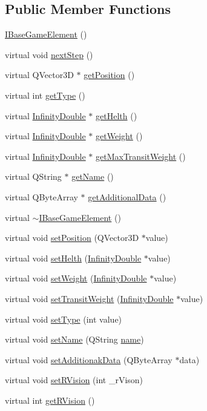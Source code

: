 \subsection*{Public Member Functions}
\begin{DoxyCompactItemize}
\item 
\hyperlink{a00137_ae72e1c7b4ecb3cf88e2a86ff4a331e88}{I\+Base\+Game\+Element} ()
\item 
virtual void \hyperlink{a00137_ae2be75da1a2a9edfabe993770e24654a}{next\+Step} ()
\item 
virtual Q\+Vector3D $\ast$ \hyperlink{a00137_a3159c02c1118989e3476b52d89a52401}{get\+Position} ()
\item 
virtual int \hyperlink{a00137_a639bd1e233821ff606bb8fe2931f6ee7}{get\+Type} ()
\item 
virtual \hyperlink{a00161}{Infinity\+Double} $\ast$ \hyperlink{a00137_a13a00e39ece3e20e3f5e049224da8d40}{get\+Helth} ()
\item 
virtual \hyperlink{a00161}{Infinity\+Double} $\ast$ \hyperlink{a00137_a935a07134430bbb44c3214629d607a3d}{get\+Weight} ()
\item 
virtual \hyperlink{a00161}{Infinity\+Double} $\ast$ \hyperlink{a00137_a4c74c903e19ada9da9150cf9569b4e9d}{get\+Max\+Transit\+Weight} ()
\item 
virtual Q\+String $\ast$ \hyperlink{a00137_a01051b9a502128a82f9a168a14d1ecdc}{get\+Name} ()
\item 
virtual Q\+Byte\+Array $\ast$ \hyperlink{a00137_aaf3cdf5f4e893704c9f17c524a1f0a8c}{get\+Additional\+Data} ()
\item 
virtual \hyperlink{a00137_a01bfcab29a22628978a22b0f7db58623}{$\sim$\+I\+Base\+Game\+Element} ()
\item 
virtual void \hyperlink{a00137_a54dc1a743fac99db03c3f47b5c6d69c4}{set\+Position} (Q\+Vector3D $\ast$value)
\item 
virtual void \hyperlink{a00137_a2f95e7a61b5db7f2fbbfd32ff786f58c}{set\+Helth} (\hyperlink{a00161}{Infinity\+Double} $\ast$value)
\item 
virtual void \hyperlink{a00137_a4b5e42aa7985c9bf959f0275cbc1bac7}{set\+Weight} (\hyperlink{a00161}{Infinity\+Double} $\ast$value)
\item 
virtual void \hyperlink{a00137_ac480b8140b5b290f49b4b96a47291180}{set\+Transit\+Weight} (\hyperlink{a00161}{Infinity\+Double} $\ast$value)
\item 
virtual void \hyperlink{a00137_a324cba2176155a50b5a2239eb0a8b6a0}{set\+Type} (int value)
\item 
virtual void \hyperlink{a00137_a874f246d3249a989750e3db85ea4bfcd}{set\+Name} (Q\+String \hyperlink{a00137_af35fba4ed599605c3d78b3c3a71fa467}{name})
\item 
virtual void \hyperlink{a00137_a71d8528482d5be16100ad56dbfd4aae9}{set\+Additionak\+Data} (Q\+Byte\+Array $\ast$data)
\item 
virtual void \hyperlink{a00137_a2719e14051c30f39ca60f4998e48abf9}{set\+R\+Vision} (int \+\_\+r\+Vison)
\item 
virtual int \hyperlink{a00137_a4437ee7dcdb6e3e3c58c8b00d8bb0500}{get\+R\+Vision} ()
\end{DoxyCompactItemize}
